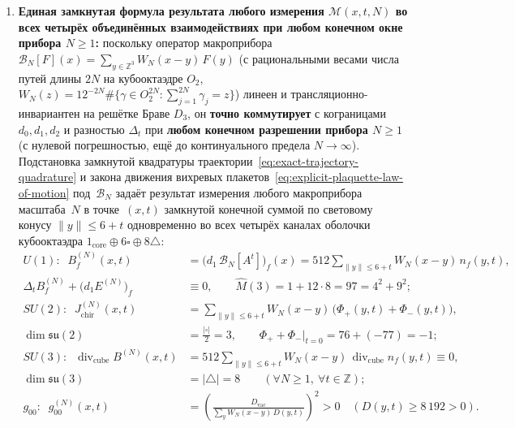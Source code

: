 \begin{theorem}
\begin{enumerate}[label=(\roman*)]
  и плакетную напряжённость $B_f = (d_1 A)_f = 512\,n_f$ с тождеством Бьянки $d_2 B \equiv 0$~\eqref{eq:discrete-gauss-b},
  а знаменатель ворот $D(x) = \zeta_{\mathrm{real}}(x) + \mu^2(x) + K_P$ и реберное преломление $\Delta_t A_\perp = (d_0\Phi)_\perp < 0$~\eqref{eq:local-edge-refraction} ---
  в оптическую метрику с показателем преломления $n(x) = D(x)/D_{\mathrm{vac}} \ge 1$ и компонентой $g_{00}(x) = n(x)^{-2}$.
\item \textbf{Единая замкнутая формула результата любого измерения $\mathcal{M}(x,t,N)$ во всех четырёх объединённых взаимодействиях при любом конечном окне прибора $N\ge 1$:}
  поскольку оператор макроприбора $\mathcal{B}_N[F](x) = \sum_{y\in\mathbb{Z}^3} W_N(x-y)\,F(y)$ (с рациональными весами числа путей длины $2N$ на кубооктаэдре $O_2$, $W_N(z) = 12^{-2N}\#\{\gamma\in O_2^{2N}:\sum_{j=1}^{2N}\gamma_j = z\}$) линеен и трансляционно-инвариантен на решётке Браве $D_3$, он \textbf{точно коммутирует} с кограницами $d_0,d_1,d_2$ и разностью $\Delta_t$ при \textbf{любом конечном разрешении прибора $N\ge 1$} (с нулевой погрешностью, ещё до континуального предела $N\to\infty$). Подстановка замкнутой квадратуры траектории~\eqref{eq:exact-trajectory-quadrature} и закона движения вихревых плакетов~\eqref{eq:explicit-plaquette-law-of-motion} под~$\mathcal{B}_N$ задаёт результат измерения любого макроприбора масштаба~$N$ в точке~$(x,t)$ замкнутой конечной суммой по световому конусу $\|y\|\le 6+t$ одновременно во всех четырёх каналах оболочки кубооктаэдра $1_{\mathrm{core}}\oplus 6\square\oplus 8\triangle$:
  \begin{equation}
  \label{eq:closed-form-measurement-b-n}
  \begin{aligned}
    U(1)\colon\;\;
    B_f^{(N)}(x,t) &= \bigl(d_1\,\mathcal{B}_N[A^t]\bigr)_f(x) = 512\sum_{\|y\|\le 6+t} W_N(x-y)\,n_f(y,t), \\
    \Delta_t B_f^{(N)} + \bigl(d_1 E^{(N)}\bigr)_f &\equiv 0, \qquad \hat M(3) = 1 + 12\cdot 8 = 97 = 4^2 + 9^2; \\
    SU(2)\colon\;\;
    J_{\mathrm{chir}}^{(N)}(x,t) &= \sum_{\|y\|\le 6+t} W_N(x-y)\,\bigl(\Phi_+(y,t) + \Phi_-(y,t)\bigr), \\
    \dim\mathfrak{su}(2) &= \frac{|\square|}{2} = 3,\qquad \Phi_+ + \Phi_- \big|_{t=0} = 76 + (-77) = -1; \\
    SU(3)\colon\;\;
    \operatorname{div}_{\mathrm{cube}} B^{(N)}(x,t) &= 512\sum_{\|y\|\le 6+t} W_N(x-y)\,\operatorname{div}_{\mathrm{cube}} n_f(y,t) \equiv 0, \\
    \dim\mathfrak{su}(3) &= |\triangle| = 8 \qquad (\forall N\ge 1,\ \forall t\in\mathbb{Z}); \\
    g_{00}\colon\;\;
    g_{00}^{(N)}(x,t) &= \left(\frac{D_{\mathrm{vac}}}{\sum_{y} W_N(x-y)\,D(y,t)}\right)^{\!2} > 0 \quad (D(y,t) \ge 8\,192 > 0).
  \end{aligned}
  \end{equation}
\end{enumerate}
\end{theorem}

